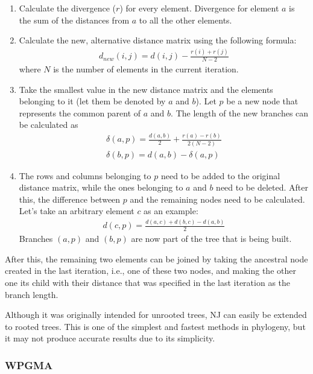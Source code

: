 \documentclass[11pt,twocolumn]{article}
\begin{document}
\begin{enumerate}
\item Calculate the divergence ($r$) for every element. Divergence for element $a$ is the sum of the distances from $a$ to all the other elements.

\item Calculate the new, alternative distance matrix using the following formula:
\begin{align}
d_{new}(i, j) = d(i, j) - \frac{r(i) + r(j)}{N - 2}
\end{align}
where $N$ is the number of elements in the current iteration.

\item Take the smallest value in the new distance matrix and the elements belonging to it (let them be denoted by $a$ and $b$). Let $p$ be a new node that represents the common parent of $a$ and $b$. The length of the new branches can be calculated as
\begin{align}
\delta(a, p) = \frac{d(a, b)}{2} + \frac{r(a) - r(b)}{2 (N - 2)} \\
\delta(b, p) = d(a, b) - \delta(a, p)
\end{align}

\item The rows and columns belonging to $p$ need to be added to the original distance matrix, while the ones belonging to $a$ and $b$ need to be deleted. After this, the difference between $p$ and the remaining nodes need to be calculated. Let's take an arbitrary element $c$ as an example:
\begin{align}
d(c, p) = \frac{d(a, c) + d(b, c) - d(a, b)}{2}
\end{align}
Branches $(a, p)$ and $(b, p)$ are now part of the tree that is being built.

\end{enumerate}

After this, the remaining two elements can be joined by taking the ancestral node created in the last iteration, i.e., one of these two nodes, and making the other one its child with their distance that was specified in the last iteration as the branch length.

Although it was originally intended for unrooted trees, NJ can easily be extended to rooted trees. This is one of the simplest and fastest methods in phylogeny, but it may not produce accurate results due to its simplicity.

\subsubsection{WPGMA}
\end{document}
